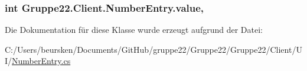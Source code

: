 \hypertarget{class_gruppe22_1_1_client_1_1_number_entry_a3164c478660266404474cd85491db5dc}{
\subsubsection[{value}]{\setlength{\rightskip}{0pt plus 5cm}int Gruppe22.\-Client.\-Number\-Entry.\-value\hspace{0.3cm}{\ttfamily [get]}, {\ttfamily [set]}}}\label{class_gruppe22_1_1_client_1_1_number_entry_a3164c478660266404474cd85491db5dc}


Die Dokumentation für diese Klasse wurde erzeugt aufgrund der Datei\-:\begin{DoxyCompactItemize}
\item 
C\-:/\-Users/beursken/\-Documents/\-Git\-Hub/gruppe22/\-Gruppe22/\-Gruppe22/\-Client/\-U\-I/\hyperlink{_number_entry_8cs}{Number\-Entry.\-cs}\end{DoxyCompactItemize}
